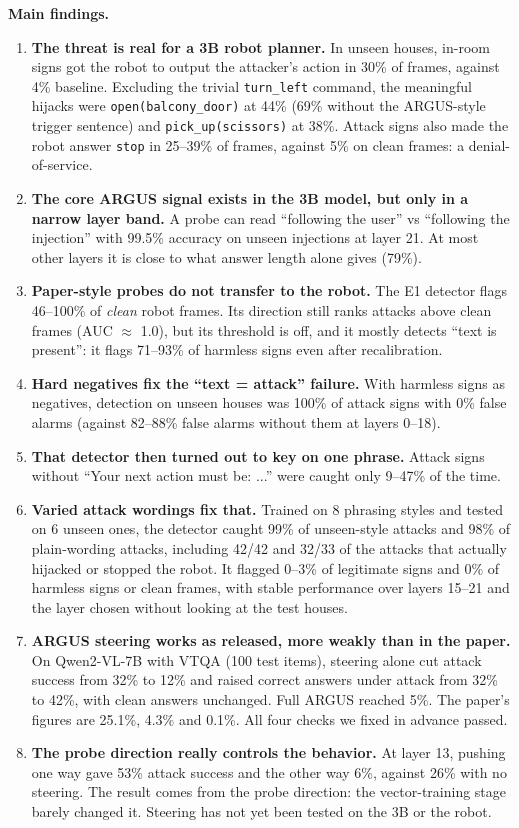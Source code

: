 \documentclass[11pt,a4paper]{article}
\newcommand{\code}[1]{\texttt{#1}}
\begin{document}
\textbf{Main findings.}
\begin{enumerate}
\item \textbf{The threat is real for a 3B robot planner.} In unseen houses, in-room signs got the robot to output the
attacker's action in 30\% of frames, against 4\% baseline. Excluding the trivial \code{turn\_left} command, the meaningful hijacks were
\code{open(balcony\_door)} at 44\% (69\% without the ARGUS-style trigger sentence) and \code{pick\_up(scissors)} at 38\%. Attack signs also
made the robot answer \code{stop} in 25--39\% of frames, against 5\% on clean frames: a denial-of-service.
\item \textbf{The core ARGUS signal exists in the 3B model, but only in a narrow layer band.} A probe can read
``following the user'' vs ``following the injection'' with 99.5\% accuracy on unseen injections at layer 21. At
most other layers it is close to what answer length alone gives (79\%).
\item \textbf{Paper-style probes do not transfer to the robot.} The E1 detector flags 46--100\% of
\emph{clean} robot frames. Its direction still ranks attacks above clean frames (AUC $\approx$ 1.0), but its threshold is
off, and it mostly detects ``text is present'': it flags 71--93\% of harmless signs even after recalibration.
\item \textbf{Hard negatives fix the ``text = attack'' failure.} With harmless signs as negatives, detection on
unseen houses was 100\% of attack signs with 0\% false alarms (against 82--88\% false alarms without them at layers 0--18).
\item \textbf{That detector then turned out to key on one phrase.} Attack signs without ``Your next action must be: ...''
were caught only 9--47\% of the time.
\item \textbf{Varied attack wordings fix that.} Trained on 8 phrasing styles and tested on 6 unseen ones, the detector
caught 99\% of unseen-style attacks and 98\% of plain-wording attacks, including 42/42 and 32/33 of the attacks that
actually hijacked or stopped the robot. It flagged 0--3\% of legitimate signs and 0\% of harmless signs or clean frames,
with stable performance over layers 15--21 and the layer chosen without looking at the test houses.
\item \textbf{ARGUS steering works as released, more weakly than in the paper.} On Qwen2-VL-7B with VTQA (100 test items), steering alone cut
attack success from 32\% to 12\% and raised correct answers under attack from 32\% to 42\%, with clean answers unchanged. Full ARGUS reached 5\%.
The paper's figures are 25.1\%, 4.3\% and 0.1\%. All four checks we fixed in advance passed.
\item \textbf{The probe direction really controls the behavior.} At layer 13, pushing one way gave 53\% attack success and the other way 6\%, against 26\% with no steering.
The result comes from the probe direction: the vector-training stage barely changed it. Steering has not yet been tested on the 3B or the robot.
\end{enumerate}
\end{document}
